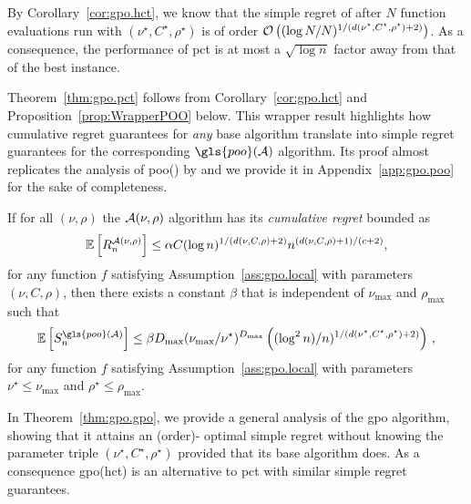 By Corollary~\ref{cor:gpo.hct}, we know that the simple regret of \HCT after $N$ function evaluations run with $(\nu^\star,C^\star,\rho^\star)$ is of order $\mathcal{O}\left( (\log N/N)^{1/(d(\nu^{\star},C^\star,\rho^{\star})+2)} \right)$. As a consequence, the performance of \gls{pct} is at most a $\sqrt{\log n}$ factor away from that of the best \HCT instance.

Theorem~\ref{thm:gpo.pct} follows from Corollary~\ref{cor:gpo.hct} and Proposition~\ref{prop:WrapperPOO} below. This wrapper result highlights how cumulative regret guarantees for \emph{any} base algorithm translate into simple regret guarantees for the corresponding $\gls{poo}(\cA)$ algorithm. Its proof almost replicates the analysis of \gls{poo}{}(\HOO) by \cite{grill2015poo} and we provide it in Appendix~\ref{app:gpo.poo} for the sake of completeness.  

\begin{proposition}\label{prop:WrapperPOO}
\begin{leftbar}[propositionbar]
If for all $(\nu,\rho)$ the $\mathcal{A}(\nu,\rho)$ algorithm has its \emph{cumulative regret} bounded as
\begin{equation}
    \mathbb{E}\left[R_n^{\mathcal{A}(\nu,\rho)}\right] \leq \alpha C(\log n)^{1/(d(\nu,C,\rho)+2)}n^{(d(\nu,C,\rho)+1)/(c+2)},\label{centralConditionPOO}
\end{equation}
for any function $f$ satisfying Assumption~\ref{ass:gpo.local} with parameters $(\nu,C,\rho)$, then there exists a constant $\beta$ that is independent of $\nu_{\max}$ and $\rho_{\max}$ such that 
\[
    \mathbb{E}\left[S_n^{\gls{poo}(\cA)}\right]  \leq \beta D_{\max}(\nu_{\max}/\nu^\star)^{D_{\max}} \left( (\log^2 n)/n)^{1/(d(\nu^\star,C^\star,\rho^\star)+2)} \right)\,,
\]
for any function $f$ satisfying Assumption~\ref{ass:gpo.local} with parameters $\nu^\star \leq \nu_{\max}$ and $\rho^\star\leq \rho_{\max}$.
\end{leftbar}
\end{proposition}


In Theorem~\ref{thm:gpo.gpo}, we provide a general analysis of the \gls{gpo} algorithm, showing that it attains an (order)-
optimal simple regret without knowing the parameter triple $(\nu^\star,C^\star,\rho^\star)$ provided that its base algorithm does. As a consequence \gls{gpo}(\gls{hct}) is an alternative to \gls{pct} with similar simple regret guarantees.
